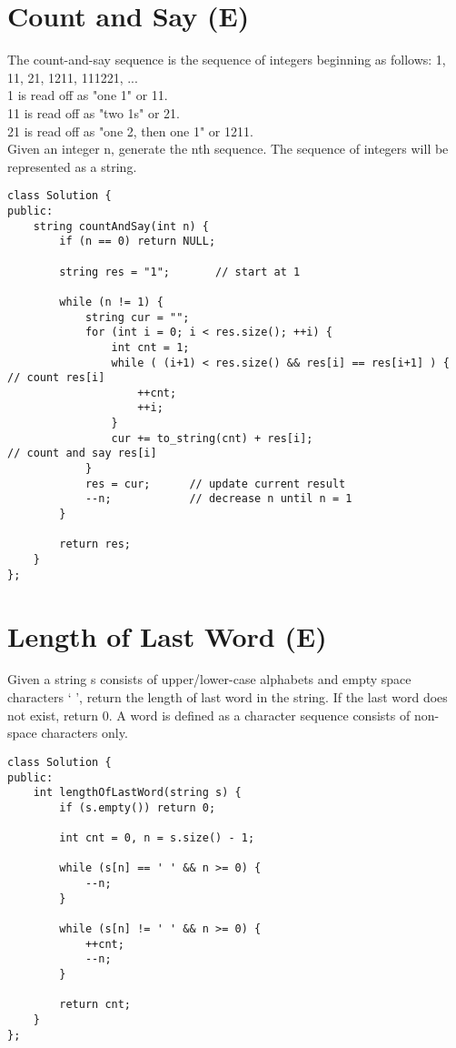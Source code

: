 \section{Count and Say (E)}
The count-and-say sequence is the sequence of integers beginning as follows: 1, 11, 21, 1211, 111221, ...\\
1 is read off as "one 1" or 11.\\
11 is read off as "two 1s" or 21.\\
21 is read off as "one 2, then one 1" or 1211.\\

Given an integer n, generate the nth sequence. The sequence of integers will be represented as a string. \\

\begin{lstlisting}
class Solution {
public:
    string countAndSay(int n) {
        if (n == 0) return NULL;
        
        string res = "1";       // start at 1
        
        while (n != 1) {
            string cur = "";
            for (int i = 0; i < res.size(); ++i) {
                int cnt = 1;
                while ( (i+1) < res.size() && res[i] == res[i+1] ) {        // count res[i]
                    ++cnt;
                    ++i;
                }
                cur += to_string(cnt) + res[i];                             // count and say res[i]
            }
            res = cur;      // update current result
            --n;            // decrease n until n = 1
        }
        
        return res;
    }
};
\end{lstlisting}


\section{Length of Last Word (E)}
Given a string s consists of upper/lower-case alphabets and empty space characters ` ', return the length of last word in the string. If the last word does not exist, return 0. A word is defined as a character sequence consists of non-space characters only. \\

\begin{lstlisting}
class Solution {
public:
    int lengthOfLastWord(string s) {
        if (s.empty()) return 0;
        
        int cnt = 0, n = s.size() - 1;
        
        while (s[n] == ' ' && n >= 0) {
            --n;
        }
        
        while (s[n] != ' ' && n >= 0) {
            ++cnt;
            --n;
        }
        
        return cnt;
    }
};
\end{lstlisting}


